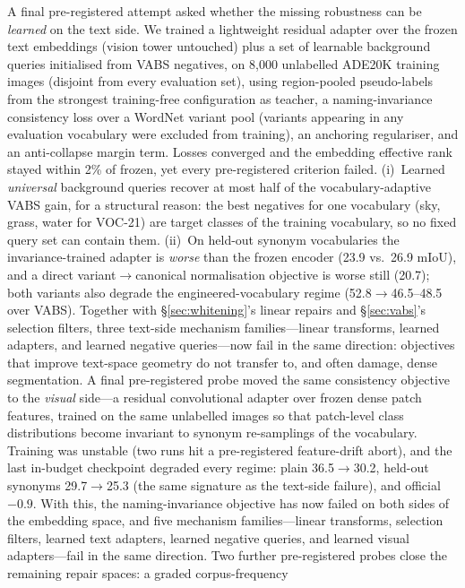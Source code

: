 \documentclass[11pt]{article}
\newcommand{\miou}{mIoU}
\begin{document}
A final pre-registered attempt asked whether the missing robustness can be
\emph{learned} on the text side. We trained a lightweight residual adapter over the
frozen text embeddings (vision tower untouched) plus a set of learnable background
queries initialised from VABS negatives, on 8{,}000 unlabelled ADE20K training
images (disjoint from every evaluation set), using region-pooled pseudo-labels from
the strongest training-free configuration as teacher, a naming-invariance
consistency loss over a WordNet variant pool (variants appearing in any evaluation
vocabulary were excluded from training), an anchoring regulariser, and an
anti-collapse margin term. Losses converged and the embedding effective rank stayed
within 2\% of frozen, yet every pre-registered criterion failed. (i)~Learned
\emph{universal} background queries recover at most half of the vocabulary-adaptive
VABS gain, for a structural reason: the best negatives for one vocabulary (sky,
grass, water for VOC-21) are target classes of the training vocabulary, so no fixed
query set can contain them. (ii)~On held-out synonym vocabularies the
invariance-trained adapter is \emph{worse} than the frozen encoder (23.9 vs.\ 26.9
\miou{}), and a direct variant$\to$canonical normalisation objective is worse still
(20.7); both variants also degrade the engineered-vocabulary regime
(52.8$\to$46.5--48.5 over VABS). Together with \S\ref{sec:whitening}'s linear repairs and
\S\ref{sec:vabs}'s selection filters, three text-side mechanism families---linear
transforms, learned adapters, and learned negative queries---now fail in the same
direction: objectives that improve text-space geometry do not transfer to, and
often damage, dense segmentation. A final pre-registered probe moved the same
consistency objective to the \emph{visual} side---a residual convolutional adapter
over frozen dense patch features, trained on the same unlabelled images so that
patch-level class distributions become invariant to synonym re-samplings of the
vocabulary. Training was unstable (two runs hit a pre-registered feature-drift
abort), and the last in-budget checkpoint degraded every regime: plain 36.5$\to$30.2,
held-out synonyms 29.7$\to$25.3 (the same signature as the text-side failure), and
official $-0.9$. With this, the naming-invariance objective has now failed on both
sides of the embedding space, and five mechanism families---linear transforms,
selection filters, learned text adapters, learned negative queries, and learned
visual adapters---fail in the same direction. Two further pre-registered
probes close the remaining repair spaces: a graded corpus-frequency
\end{document}
